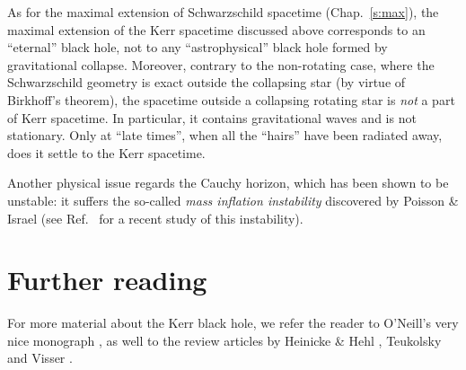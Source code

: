 As for the maximal extension of Schwarzschild spacetime (Chap.~\ref{s:max}), the
maximal extension of the Kerr spacetime discussed above
corresponds to an ``eternal'' black hole, not to any ``astrophysical'' black hole
formed by gravitational
collapse. Moreover, contrary to the non-rotating case, where the Schwarzschild geometry
is exact outside the collapsing star (by virtue of Birkhoff's theorem), the spacetime outside
a collapsing rotating star is \emph{not} a part of Kerr spacetime. In particular, it contains gravitational waves and is not stationary. Only at ``late times'', when all the ``hairs'' have
been radiated away, does it settle to the Kerr spacetime.

Another physical issue regards the Cauchy horizon, which
has been shown to be unstable: it suffers the so-called
\emph{mass inflation instability}
discovered by Poisson \& Israel \cite{PoissI90}
(see Ref.~\cite{BurkoKZ16} for a recent study of this instability).

\section{Further reading}

For more material about the Kerr black hole, we refer
the reader to O'Neill's very nice monograph \cite{ONeil95},
as well to the review articles by
Heinicke \& Hehl \cite{HeiniH15}, Teukolsky \cite{Teuko15} and
Visser \cite{Visse09}.
